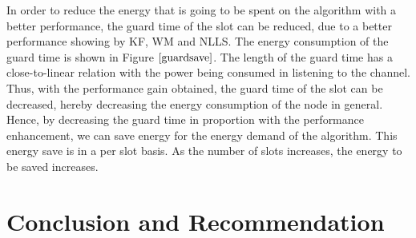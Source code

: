 \documentclass[a4paper,10pt]{report}
\begin{document}
\newline
In order to reduce the energy that is going to be spent on the algorithm with a better performance, the guard time of the slot can be reduced, due to a better performance showing by KF, WM and NLLS. The energy consumption of the guard time is shown in Figure
$\ref{guardsave}$. The length of the guard time has a close-to-linear relation with the power being consumed in listening to the channel.
Thus, with the performance gain obtained, the guard time of the slot can be decreased, hereby decreasing the energy consumption of the node in general. Hence, by decreasing the guard time in proportion with the performance enhancement, we can save energy for the energy demand of the algorithm. This energy save is in a per slot basis. As the number of slots increases, the energy to be saved increases.
\chapter{\textbf{Conclusion and Recommendation}}
\end{document}
